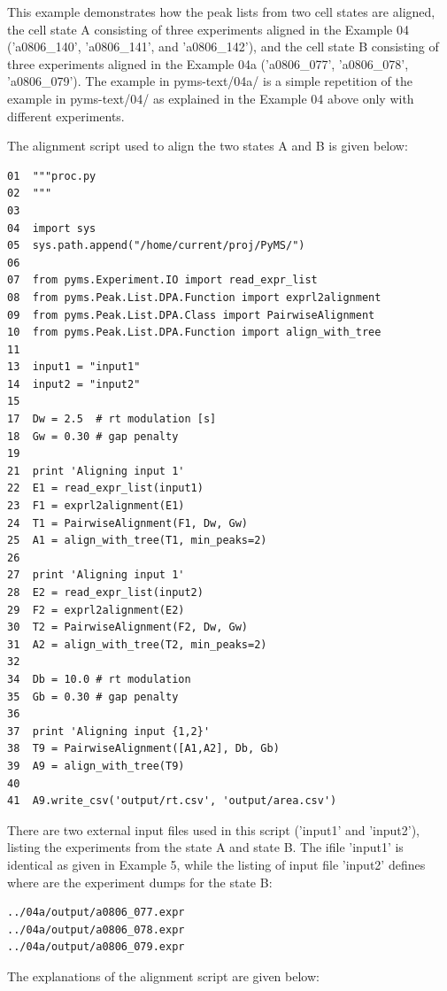 This example demonstrates how the peak lists from two cell states are
aligned, the cell state A consisting of three experiments aligned in
the Example 04 ('a0806\_140', 'a0806\_141', and 'a0806\_142'), and
the cell state B consisting of three experiments aligned in the
Example 04a ('a0806\_077', 'a0806\_078', 'a0806\_079'). The example
in pyms-text/04a/ is a simple repetition of the example in
pyms-text/04/ as explained in the Example 04 above only with
different experiments.

The alignment script used to align the two states A and B is given below:

\begin{verbatim}
01  """proc.py
02  """
03  
04  import sys
05  sys.path.append("/home/current/proj/PyMS/")
06  
07  from pyms.Experiment.IO import read_expr_list
08  from pyms.Peak.List.DPA.Function import exprl2alignment
09  from pyms.Peak.List.DPA.Class import PairwiseAlignment
10  from pyms.Peak.List.DPA.Function import align_with_tree
11  
13  input1 = "input1"
14  input2 = "input2"
15  
17  Dw = 2.5  # rt modulation [s]
18  Gw = 0.30 # gap penalty
19  
21  print 'Aligning input 1'
22  E1 = read_expr_list(input1)
23  F1 = exprl2alignment(E1)
24  T1 = PairwiseAlignment(F1, Dw, Gw)
25  A1 = align_with_tree(T1, min_peaks=2)
26  
27  print 'Aligning input 1'
28  E2 = read_expr_list(input2)
29  F2 = exprl2alignment(E2)
30  T2 = PairwiseAlignment(F2, Dw, Gw)
31  A2 = align_with_tree(T2, min_peaks=2)
32  
34  Db = 10.0 # rt modulation
35  Gb = 0.30 # gap penalty
36  
37  print 'Aligning input {1,2}'
38  T9 = PairwiseAlignment([A1,A2], Db, Gb)
39  A9 = align_with_tree(T9)
40  
41  A9.write_csv('output/rt.csv', 'output/area.csv')
\end{verbatim}
 
\noindent
There are two external input files used in this script ('input1' and
'input2'), listing the experiments from the state A and state B. The 
ifile 'input1' is identical as given in Example 5, while the listing
of input file 'input2' defines where are the experiment dumps for
the state B:

\begin{verbatim}
../04a/output/a0806_077.expr
../04a/output/a0806_078.expr
../04a/output/a0806_079.expr
\end{verbatim}

The explanations of the alignment script are given below:

